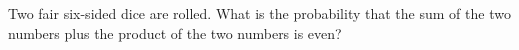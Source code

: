 Two fair six-sided dice are rolled. What is the probability that the sum of the two numbers plus the product of the two numbers is even?
